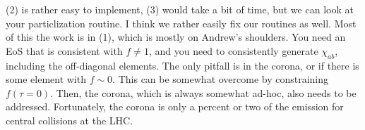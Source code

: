 \documentclass[12pt]{article}
\numberwithin{equation}{section}
\numberwithin{figure}{section}
\begin{document}
(2) is rather easy to implement, (3) would take a bit of time, but we can look at your particlization routine. I think we rather easily fix our routines as well. Most of this the work is in (1), which is mostly on Andrew's shoulders. You need an EoS that is consistent with $f\ne 1$, and you need to consistently generate $\chi_{ab}$, including the off-diagonal elements. The only pitfall is in the corona, or if there is some element with $f\sim 0$. This can be somewhat overcome by constraining $f(\tau=0)$. Then, the corona, which is always somewhat ad-hoc, also needs to be addressed. Fortunately, the corona is only a percent or two of the emission for central collisions at the LHC.



 





 
\end{document}
